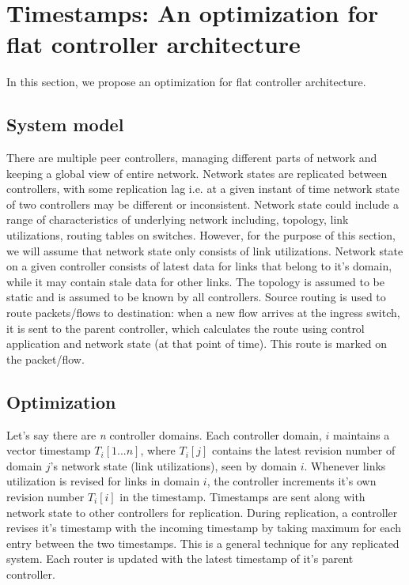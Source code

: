 \documentclass[10pt, twocolumn]{article}
\begin{document}
\section{Timestamps: An optimization for flat controller architecture}
\label{sec:timestamps}
In this section, we propose an optimization for flat controller architecture. 

\subsection{System model}
There are multiple peer controllers, managing different parts of network and keeping a global view of entire network. Network states are replicated between controllers, with some replication lag i.e. at a given instant of time network state of two controllers may be different or inconsistent. Network state could include a range of characteristics of underlying network including, topology, link utilizations, routing tables on switches. However, for the purpose of this section, we will assume that network state only consists of link utilizations. Network state on a given controller consists of latest data for links that belong to it's domain, while it may contain stale data for other links. The topology is assumed to be static and is assumed to be known by all controllers. Source routing is used to route packets/flows to destination: when a new flow arrives at the ingress switch, it is sent to the parent controller, which calculates the route using control application and network state (at that point of time). This route is marked on the packet/flow.
  
\subsection{Optimization}
Let's say there are \emph{n} controller domains. Each controller domain, $i$ maintains a vector timestamp $T_{i}[1...n]$, where $T_{i}[j]$ contains the latest revision number of domain $j$'s network state (link utilizations), seen by domain $i$. Whenever links utilization is revised for links in domain $i$, the controller increments it's own revision number $T_{i}[i]$ in the timestamp. Timestamps are sent along with network state to other controllers for replication. During replication, a controller revises it's timestamp with the incoming timestamp by taking maximum for each entry between the two timestamps. This is a general technique for any replicated system. Each router is updated with the latest timestamp of it's parent controller. 
\end{document}
